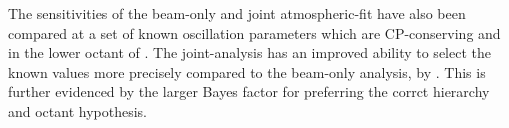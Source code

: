 \begin{table}[ht!]
  \centering
  \begingroup
  \renewcommand{\arraystretch}{1.5}
  \caption{}
  \label{tab:Conclusion_Summary}
  \endgroup
\end{table}

The sensitivities of the beam-only and joint atmospheric-fit have also been compared at a set of known oscillation parameters which are CP-conserving and in the lower octant of . The joint-analysis has an improved ability to select the known values more precisely compared to the beam-only analysis, by . This is further evidenced by the larger Bayes factor for preferring the corrct hierarchy and octant hypothesis.

